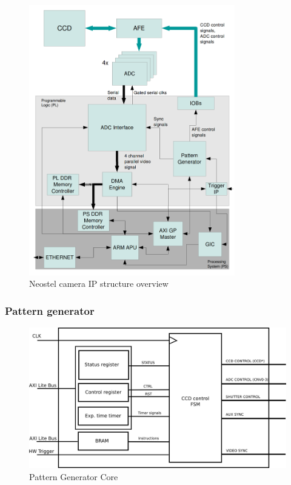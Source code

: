 \begin{figure}[H]
\centering
\includegraphics[width=0.8\textwidth]{pict/adc_interface.png}
\caption{Neostel camera IP structure overview}
\label{fig:adciface}
\end{figure}

\subsubsection{Pattern generator}
\label{sec:patgen}

\begin{figure}[H]
\centering
\includegraphics[width=\textwidth]{pict/patterngen.png}
\caption{Pattern Generator Core}
\label{fig:pattern_core}
\end{figure}

